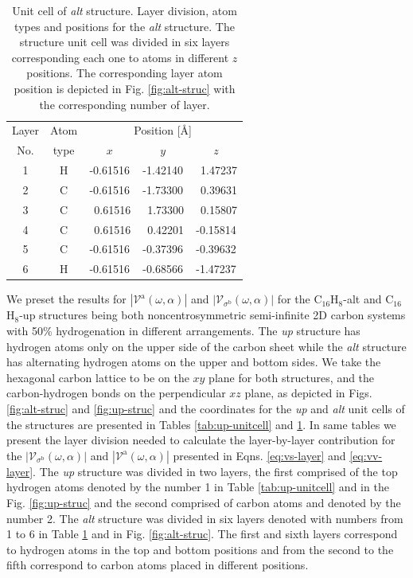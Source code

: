 \documentclass[prb,11pt,tightenlines,twocolumn,aps]{revtex4-1}
\begin{document}
\begin{table}[t]
\center
\begin{tabular}{ccccc}\\
\hline
\quad Layer \quad & \quad Atom \qquad & \multicolumn{3}{c}{Position [\AA]} \\
\cline{3-5}
\quad No.   \quad & \quad type \qquad & $x$ & $y$ & $z$  \\
\hline
1 & H &  -0.61516 &  -1.42140 & \ 1.47237 \\
2 & C &  -0.61516 &  -1.73300 & \ 0.39631 \\
3 & C & \ 0.61516 & \ 1.73300 & \ 0.15807 \\
4 & C & \ 0.61516 & \ 0.42201 &  -0.15814 \\
5 & C &  -0.61516 &  -0.37396 &  -0.39632 \\
6 & H &  -0.61516 &  -0.68566 &  -1.47237 \\
\hline
\end{tabular}

\caption{Unit cell of \emph{alt} structure. Layer division, atom types and
positions for the \emph{alt} structure. The structure unit cell was divided in
six layers corresponding each one to atoms in different $z$ positions. The
corresponding layer atom position is depicted in Fig. \ref{fig:alt-struc} with
the corresponding number of layer.}
\label{tab:alt-unitcell}
\end{table}

We preset the results for $|\mathcal{V}^{\mathrm{a}}(\omega,\alpha)|$ and
$|\mathcal{V}_{\sigma^{\mathrm{b}}}(\omega,\alpha)|$ for the C$_{16}$H$_{8}$-alt
and C$_{16}$H$_{8}$-up structures being both noncentrosymmetric semi-infinite 2D
carbon systems with 50\% hydrogenation in different arrangements. The \emph{up}
structure has hydrogen atoms only on the upper side of the carbon sheet while
the \emph{alt} structure has alternating hydrogen atoms on the upper and bottom
sides. We take the hexagonal carbon lattice to be on the $xy$ plane for both
structures, and the carbon-hydrogen bonds on the perpendicular $xz$ plane, as
depicted in Figs. \ref{fig:alt-struc} and \ref{fig:up-struc}
% 
{\color{blue} and the coordinates for the \emph{up} and \emph{alt} unit cells of
the structures are presented in Tables \ref{tab:up-unitcell} and
% 
\ref{tab:alt-unitcell}. In same tables we present the layer division needed to
calculate the layer-by-layer contribution for the
$|\mathcal{V}_{\sigma^{\mathrm{b}}}(\omega,\alpha)|$ and
$|\mathcal{V}^{\mathrm{a}}(\omega,\alpha)|$ presented in Eqns. 
% 
\eqref{eq:vs-layer} and \eqref{eq:vv-layer}. The \emph{up} structure was divided
in two layers, the first comprised of the top hydrogen atoms denoted by the
number 1 in Table \ref{tab:up-unitcell} and in the Fig. \ref{fig:up-struc} and
the second comprised of carbon atoms and denoted by the number 2. The \emph{alt}
structure was divided in six layers denoted with numbers from 1 to 6 in Table
\ref{tab:alt-unitcell} and in Fig. \ref{fig:alt-struc}. The first and sixth
layers correspond to hydrogen atoms in the top and bottom positions and from the
second to the fifth correspond to carbon atoms placed in different positions.}
\end{document}
